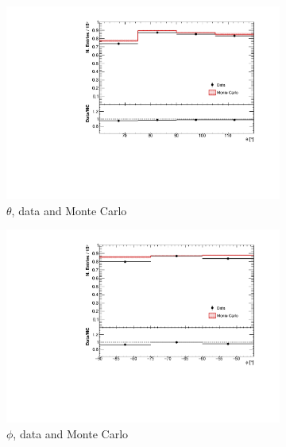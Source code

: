 \documentclass[a4paper]{scrartcl}
\begin{document}
\begin{figure}[htbp]
  \begin{center}
    \begin{subfigure}{0.52\textwidth}
      \includegraphics[width=\linewidth]{figures/theta_cry.pdf}
      \caption{$\theta$, data and Monte Carlo} \label{fig:1d_cry}
    \end{subfigure}\begin{subfigure}{0.52\textwidth}
    \includegraphics[width=\linewidth]{figures/phi_cry.pdf}
    \caption{$\phi$, data and Monte Carlo}\label{fig:1d_cry_mc}
  \end{subfigure}
  \begin{subfigure}{0.52\textwidth}

\end{subfigure}
\end{center}
\end{figure}
\end{document}
